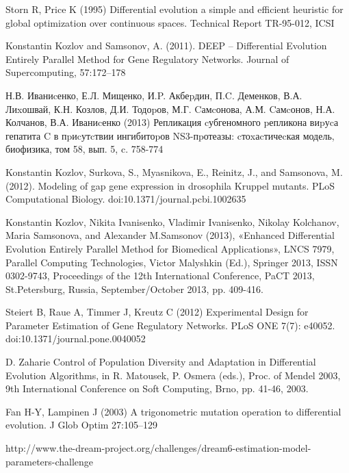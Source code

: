 
\begin{thebibliography}{20} %

	Storn R, Price K (1995) 
	Differential evolution a simple and efficient heuristic for global optimization over continuous spaces. Technical Report TR-95-012, ICSI
	
	Konstantin Kozlov and Samsonov, A. (2011). 
	DEEP – Differential Evolution Entirely Parallel Method for Gene Regulatory Networks. Journal of Supercomputing, 57:172–178
	
	Н.В. Иваниcенко, Е.Л. Мищенко, И.P. Акбеpдин, П.C. Деменков, В.А. Лиxошвай, К.Н. Козлов, Д.И. Тодоpов, М.Г. Cамcонова, А.М. Cамcонов, Н.А. Колчанов, В.А. Иваниcенко (2013) 
	Репликация cубгеномного pепликона виpуcа гепатита C в пpиcутcтвии ингибитоpов NS3-пpотеазы: cтоxаcтичеcкая модель, биофизика, том 58, вып. 5, c. 758-774

	Konstantin Kozlov, Surkova, S., Myasnikova, E., Reinitz, J., and Samsonova, M. (2012). 
	Modeling of gap gene expression in drosophila Kruppel mutants. PLoS Computational Biology. doi:10.1371/journal.pcbi.1002635

	Konstantin Kozlov, Nikita Ivanisenko, Vladimir Ivanisenko, Nikolay Kolchanov, Maria Samsonova, and Alexander M.Samsonov (2013), 
	«Enhanced Differential Evolution Entirely Parallel Method for Biomedical Applications», LNCS 7979, Parallel Computing Technologies, Victor Malyshkin (Ed.), 
	Springer 2013, ISSN 0302-9743, Proceedings of the 12th International Conference, PaCT 2013, St.Petersburg, Russia, September/October 2013, pp. 409-416.

	Steiert B, Raue A, Timmer J, Kreutz C (2012) 
	Experimental Design for Parameter Estimation of Gene Regulatory Networks. PLoS ONE 7(7): e40052. doi:10.1371/journal.pone.0040052
	
	D. Zaharie
	Control of Population Diversity and Adaptation in Differential Evolution Algorithms, 
	in R. Matousek, P. Osmera (eds.), Proc. of Mendel 2003, 9th International Conference on Soft Computing, Brno, pp. 41-46, 2003.
	
	Fan H-Y, Lampinen J (2003) 
	A trigonometric mutation operation to differential evolution. J Glob Optim 27:105–129
	
	http://www.the-dream-project.org/challenges/dream6-estimation-model-parameters-challenge

\end{thebibliography}
